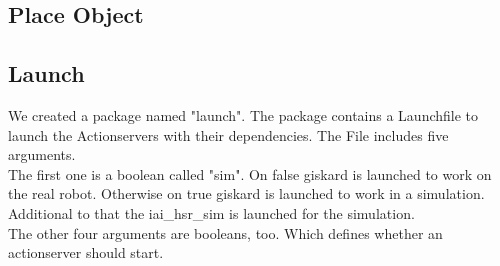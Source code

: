\documentclass[main.tex]{subfiles}
\begin{document}
	
	\vspace{1cm}
	
	\subsection{Place Object}
	
	\vspace{1cm}
	
	\subsection{Launch}
	We created a package named "launch". The package contains a Launchfile to launch the Actionservers with their dependencies. The File includes five arguments.\\
	The first one is a boolean called "sim". On false giskard is launched to work on the real robot. Otherwise on true giskard is launched to work in a simulation. Additional to that the iai\_hsr\_sim is launched for the simulation.\\
	The other four arguments are booleans, too. Which defines whether an actionserver should start. 
\end{document}
